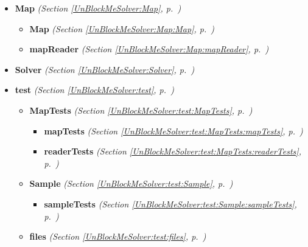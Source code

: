 \begin{itemize}
\setlength{\parskip}{0ex}
\item \textbf{Map}
  \textit{(Section \ref{UnBlockMeSolver:Map}, p.~\pageref{UnBlockMeSolver:Map})}

  \begin{itemize}
\setlength{\parskip}{0ex}
    \item \textbf{Map}
  \textit{(Section \ref{UnBlockMeSolver:Map:Map}, p.~\pageref{UnBlockMeSolver:Map:Map})}

    \item \textbf{mapReader}
  \textit{(Section \ref{UnBlockMeSolver:Map:mapReader}, p.~\pageref{UnBlockMeSolver:Map:mapReader})}

  \end{itemize}
\item \textbf{Solver}
  \textit{(Section \ref{UnBlockMeSolver:Solver}, p.~\pageref{UnBlockMeSolver:Solver})}

\item \textbf{test}
  \textit{(Section \ref{UnBlockMeSolver:test}, p.~\pageref{UnBlockMeSolver:test})}

  \begin{itemize}
\setlength{\parskip}{0ex}
    \item \textbf{MapTests}
  \textit{(Section \ref{UnBlockMeSolver:test:MapTests}, p.~\pageref{UnBlockMeSolver:test:MapTests})}

      \begin{itemize}
    \setlength{\parskip}{0ex}
        \item \textbf{mapTests}
  \textit{(Section \ref{UnBlockMeSolver:test:MapTests:mapTests}, p.~\pageref{UnBlockMeSolver:test:MapTests:mapTests})}

        \item \textbf{readerTests}
  \textit{(Section \ref{UnBlockMeSolver:test:MapTests:readerTests}, p.~\pageref{UnBlockMeSolver:test:MapTests:readerTests})}

      \end{itemize}
    \item \textbf{Sample}
  \textit{(Section \ref{UnBlockMeSolver:test:Sample}, p.~\pageref{UnBlockMeSolver:test:Sample})}

      \begin{itemize}
    \setlength{\parskip}{0ex}
        \item \textbf{sampleTests}
  \textit{(Section \ref{UnBlockMeSolver:test:Sample:sampleTests}, p.~\pageref{UnBlockMeSolver:test:Sample:sampleTests})}

      \end{itemize}
    \item \textbf{files}
  \textit{(Section \ref{UnBlockMeSolver:test:files}, p.~\pageref{UnBlockMeSolver:test:files})}

  \end{itemize}
\end{itemize}


